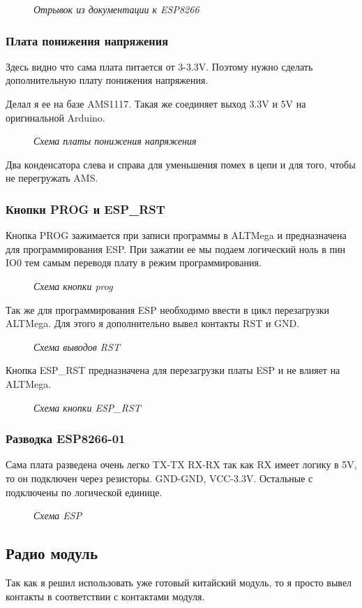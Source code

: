 \documentclass[a4paper, 12pt]{article}
\newcommand{\image}[3]{\begin{figure}[h!]\center{\texttt{[image: \#1]} }\caption{\textit{#3}}\end{figure}}
\begin{document}
\image{документация_к_esp.png}{300}{Отрывок из документации к ESP8266}

\subsubsection{Плата понижения напряжения}

Здесь видно что сама плата питается от 3-3.3V. Поэтому нужно сделать  
дополнительную плату понижения напряжения.

Делал я ее на базе AMS1117. Такая же соединяет выход 3.3V и 5V на оригинальной 
Arduino.

\image{Схема_понижения_напряжения.png}{100}{Схема платы понижения напряжения}

Два конденсатора слева и справа для уменьшения помех в цепи и для 
того, чтобы не перегружать AMS.

\subsubsection{Кнопки PROG и ESP\_RST}
Кнопка PROG зажимается при записи программы в ALTMega и предназначена для 
программирования ESP. При зажатии ее мы подаем логический ноль в пин IO0 тем 
самым переводя плату в режим программирования.

\image{Схема_кнопка_prog.png}{150}{Схема кнопки prog}

Так же для программирования ESP необходимо ввести в цикл перезагрузки ALTMega. 
Для этого я дополнительно вывел контакты RST и GND.

\image{Схема_вывода_rst.png}{100}{Схема выводов RST}

Кнопка ESP\_RST предназначена для перезагрузки платы ESP и не влияет на ALTMega. 

\image{Схема_кнопка_esp_rst.png}{150}{Схема кнопки ESP\_RST}

\newpage

\subsubsection{Разводка ESP8266-01}
Сама плата разведена очень легко TX-TX RX-RX так как RX имеет логику в 5V, то 
он подключен через резисторы. GND-GND, VCC-3.3V. Остальные с подключены по 
логической единице. 

\image{Схема_ESP.png}{100}{Схема ESP}

\subsection{Радио модуль}
Так как я решил использовать уже готовый китайский модуль, то я просто вывел 
контакты в соответствии с контактами модуля.
\end{document}
